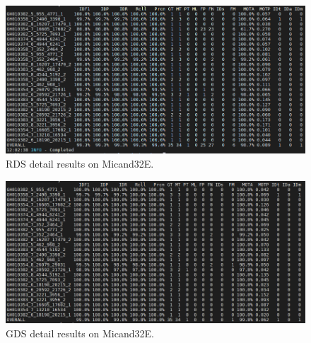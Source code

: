 \begin{figure}
	\centerline{\includegraphics[width=1\linewidth]{Figs/Evaluation/micand26/rds.png}}
	\caption{RDS detail results on Micand32E.}
\end{figure}
\begin{figure}
	\centerline{\includegraphics[width=1\linewidth]{Figs/Evaluation/micand26/gds.png}}
	\caption{GDS detail results on Micand32E.}
\end{figure}
